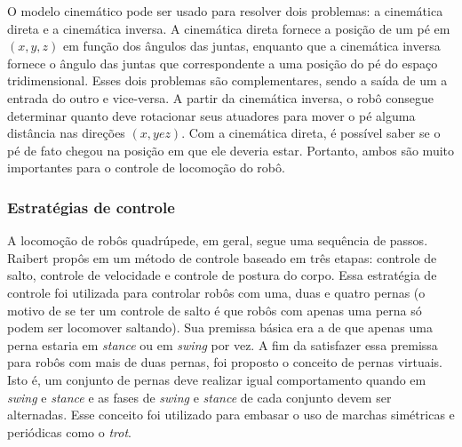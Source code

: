 \documentclass[../main.tex]{subfiles}
\begin{document}
O modelo cinemático pode ser usado para resolver dois problemas: a cinemática direta e a cinemática inversa. A cinemática direta fornece a posição de um pé em $(x, y, z)$ em função dos ângulos das juntas, enquanto que a cinemática inversa fornece o ângulo das juntas que correspondente a uma posição do pé do espaço tridimensional. Esses dois problemas são complementares, sendo a saída de um a entrada do outro e vice-versa. A partir da cinemática inversa, o robô consegue determinar quanto deve rotacionar seus atuadores para mover o pé alguma distância nas direções $(x, y e z)$. Com a cinemática direta, é possível saber se o pé de fato chegou na posição em que ele deveria estar. Portanto, ambos são muito importantes para o controle de locomoção do robô.

\subsubsection{Estratégias de controle}
A locomoção de robôs quadrúpede, em geral, segue uma sequência de passos. Raibert propôs em \cite{Raibert1986} um método de controle baseado em três etapas: controle de salto, controle de velocidade e controle de postura do corpo. Essa estratégia de controle foi utilizada para controlar robôs com uma, duas e quatro pernas (o motivo de se ter um controle de salto é que robôs com apenas uma perna só podem ser locomover saltando). Sua premissa básica era a de que apenas uma perna estaria em \textit{stance} ou em \textit{swing} por vez. A fim da satisfazer essa premissa para robôs com mais de duas pernas, foi proposto o conceito de pernas virtuais. Isto é, um conjunto de pernas deve realizar igual comportamento quando em \textit{swing} e \textit{stance} e as fases de \textit{swing} e \textit{stance} de cada conjunto devem ser alternadas. Esse conceito foi utilizado para embasar o uso de marchas simétricas e periódicas como o \textit{trot}.
\end{document}
